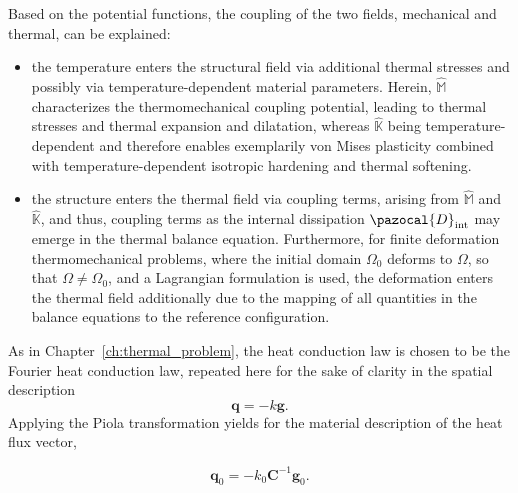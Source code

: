 Based on the potential functions, the coupling of the two fields, mechanical and thermal, can be explained:
\begin{itemize}
  \item the temperature enters the structural field via additional thermal stresses and possibly via temperature-dependent material parameters.
  Herein, \(\hat{\mathbb{M}}\) characterizes the thermomechanical coupling potential, leading to thermal stresses and thermal expansion and dilatation, whereas \(\hat{\mathbb{K}}\) being temperature-dependent and therefore enables exemplarily von Mises plasticity combined with temperature-dependent isotropic hardening and thermal softening.
  \item the structure enters the thermal field via coupling terms, arising from \(\hat{\mathbb{M}}\) and \(\hat{\mathbb{K}}\), and thus, coupling terms as the internal dissipation \(\pazocal{D}_{\text {int}}\) may emerge in the thermal balance equation.
  Furthermore, for finite deformation thermomechanical problems, where the initial domain \(\Omega_{0}\) deforms to \(\Omega\), so that \(\Omega \neq \Omega_{0}\), and a Lagrangian formulation is used, the deformation enters the thermal field additionally due to the mapping of all quantities in the balance equations to the reference configuration.
\end{itemize}

As in Chapter~\ref{ch:thermal_problem}, the heat conduction law is chosen to be the Fourier heat conduction law, repeated here for the sake of clarity in the spatial description
\begin{equation}
  \bm q = - k \bm g.
\end{equation}
Applying the Piola transformation yields for the material description of the heat flux vector,
\begin{highlight}
  \begin{equation}
    \bm q_0 = - k_0 \bm C^{-1} \bm g_0.
  \end{equation}
\end{highlight}

